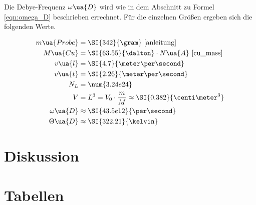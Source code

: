 Die Debye-Frequenz $\omega\ua{D}$ wird wie in dem Abschnitt zu Formel \eqref{eqn:omega_D}
beschrieben errechnet.
Für die einzelnen Größen ergeben sich die folgenden Werte.

\begin{align*}
  m\ua{Probe} &= \SI{342}{\gram} \text{~\cite{anleitung}}\\
  M\ua{Cu} &= \SI{63.55}{\dalton}\cdot N\ua{A} \text{~\cite{cu_mass}}\\
  v\ua{l} &= \SI{4.7}{\meter\per\second}\\
  v\ua{t} &= \SI{2.26}{\meter\per\second}\\
  N_L &= \num{3.24e24} \\
  V &= L^3 = V_0\cdot\frac{m}{M}\approx \SI{0.382}{\centi\meter^3}\\
  \omega\ua{D} &\approx \SI{43.5e12}{\per\second}\\
  \Theta\ua{D} &\approx \SI{322.21}{\kelvin}
\end{align*}

\section{Diskussion}
\label{sec:diskussion}

\newpage
\section{Tabellen}
\label{sec:tabellen}
\pagestyle{empty}

